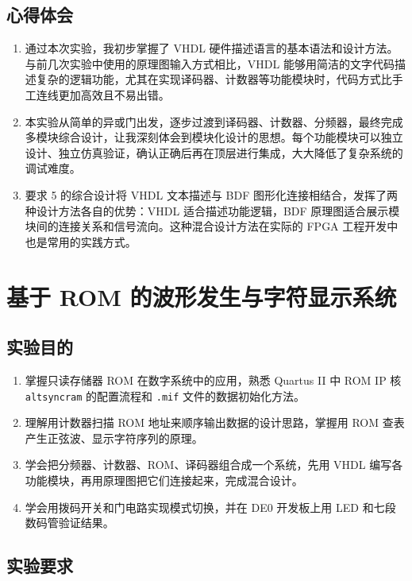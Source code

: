 \documentclass{ctexrep}
\begin{document}
\section{心得体会}

\begin{enumerate}
    \item 通过本次实验，我初步掌握了 VHDL 硬件描述语言的基本语法和设计方法。与前几次实验中使用的原理图输入方式相比，VHDL 能够用简洁的文字代码描述复杂的逻辑功能，尤其在实现译码器、计数器等功能模块时，代码方式比手工连线更加高效且不易出错。
    \item 本实验从简单的异或门出发，逐步过渡到译码器、计数器、分频器，最终完成多模块综合设计，让我深刻体会到模块化设计的思想。每个功能模块可以独立设计、独立仿真验证，确认正确后再在顶层进行集成，大大降低了复杂系统的调试难度。
    \item 要求 5 的综合设计将 VHDL 文本描述与 BDF 图形化连接相结合，发挥了两种设计方法各自的优势：VHDL 适合描述功能逻辑，BDF 原理图适合展示模块间的连接关系和信号流向。这种混合设计方法在实际的 FPGA 工程开发中也是常用的实践方式。
\end{enumerate}

\graphicspath{{../5. rom/figures/}}
\chapter{基于 ROM 的波形发生与字符显示系统}

\section{实验目的}

\begin{enumerate}
    \item 掌握只读存储器 ROM 在数字系统中的应用，熟悉 Quartus II 中 ROM IP 核 \texttt{altsyncram} 的配置流程和 \texttt{.mif} 文件的数据初始化方法。
    \item 理解用计数器扫描 ROM 地址来顺序输出数据的设计思路，掌握用 ROM 查表产生正弦波、显示字符序列的原理。
    \item 学会把分频器、计数器、ROM、译码器组合成一个系统，先用 VHDL 编写各功能模块，再用原理图把它们连接起来，完成混合设计。
    \item 学会用拨码开关和门电路实现模式切换，并在 DE0 开发板上用 LED 和七段数码管验证结果。
\end{enumerate}

\section{实验要求}
\end{document}
